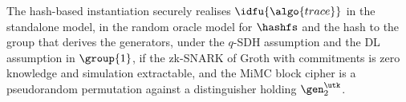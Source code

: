 \begin{theorem}\label{thm:hash-inst} The hash-based instantiation securely
realises $\idfu{\algo{trace}}$ in the standalone model, in the random oracle
model for $\hashfs$ and the hash to the group that derives the generators,
under the $q$-SDH assumption and the DL assumption in
$\group{1}$, if the zk-SNARK of Groth with commitments is zero knowledge and
simulation extractable, and the MiMC block cipher is a pseudorandom permutation
against a distinguisher holding $\gen_2^{\utk}$.  \end{theorem}
